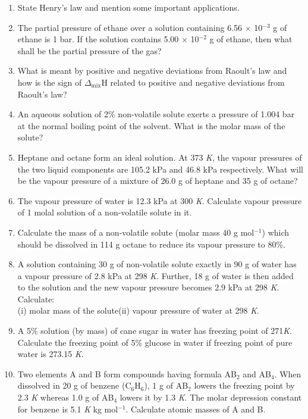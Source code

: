 \documentclass[11pt,a4paper]{article}
\begin{document}
\begin{minipage}[t]{0.85\textwidth}
\begin{tcolorbox}
\begin{enumerate}[label=\textbf{1.\arabic*},leftmargin=38pt,itemsep=3pt,topsep=0pt,start=5]
\item State Henry's law and mention some important applications.
\item The partial pressure of ethane over a solution containing 6.56 $\times$ 10$^{-3}$ g of ethane is 1 bar. If the solution contains 5.00 $\times$ 10$^{-2}$ g of ethane, then what shall be the partial pressure of the gas?
\item What is meant by positive and negative deviations from Raoult's law and how is the sign of $\Delta_{\text{mix}}$H related to positive and negative deviations from Raoult's law?
\item An aqueous solution of 2\% non-volatile solute exerts a pressure of 1.004 bar at the normal boiling point of the solvent. What is the molar mass of the solute?
\item Heptane and octane form an ideal solution. At 373 \textit{K}, the vapour pressures of the two liquid components are 105.2 kPa and 46.8 kPa respectively. What will be the vapour pressure of a mixture of 26.0 g of heptane and 35 g of octane?
\item The vapour pressure of water is 12.3 kPa at 300 \textit{K}. Calculate vapour pressure of 1 molal solution of a non-volatile solute in it.
\item Calculate the mass of a non-volatile solute (molar mass 40 g mol$^{-1}$) which should be dissolved in 114 g octane to reduce its vapour pressure to 80\%.
\item A solution containing 30 g of non-volatile solute exactly in 90 g of water has a vapour pressure of 2.8 kPa at 298 \textit{K}. Further, 18 g of water is then added to the solution and the new vapour pressure becomes 2.9 kPa at 298 \textit{K}. Calculate:\\
(i) molar mass of the solute\hspace{2em}(ii) vapour pressure of water at 298 \textit{K}.
\item A 5\% solution (by mass) of cane sugar in water has freezing point of 271\textit{K}. Calculate the freezing point of 5\% glucose in water if freezing point of pure water is 273.15 \textit{K}.
\item Two elements A and B form compounds having formula AB$_2$ and AB$_4$. When dissolved in 20 g of benzene (C$_6$H$_6$), 1 g of AB$_2$ lowers the freezing point by 2.3 \textit{K} whereas 1.0 g of AB$_4$ lowers it by 1.3 \textit{K}. The molar depression constant for benzene is 5.1 \textit{K} kg mol$^{-1}$. Calculate atomic masses of A and B.
\end{enumerate}
\end{tcolorbox}
\end{minipage}
\end{document}
